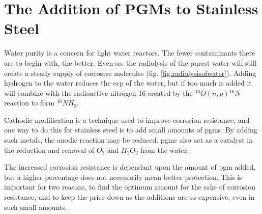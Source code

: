 \section[Addition of PGMs]{The Addition of PGMs to Stainless Steel}

Water purity is a concern for light water reactors.  The fewer contaminants there are to begin with, the better.  Even so, the radiolysis of the purest water will still create a steady supply of corrosive molecules (fig. \ref{fig:radiolysisofwater}).  Adding hydrogen to the water reduces the \acrlong{ecp} of the water, but if too much is added it will combine with the radioactive nitrogen-16 created by the ${}^{16}O(n,p){}^{16}N$ reaction to form ${}^{16}NH_{3}$\cite{noblemetalchemical}.

Cathodic modification is a technique used to improve corrosion resistance, and one way to do this for stainless steel is to add small amounts of \acrfull{pgm}s\cite{potgieter1994}.  By adding such metals, the anodic reaction may be reduced.  \acrshort{pgm}s also act as a catalyst in the reduction and removal of $O_2$ and $H_2O_2$ from the water\cite{noblemetalchemical}.

The increased corrosion resistance is dependant upon the amount of \acrshort{pgm} added, but a higher percentage does not necessarily mean better protection.  This is important for two reasons, to find the optimum amount for the sake of corrosion resistance, and to keep the price down as the additions are so expensive, even in such small amounts.

